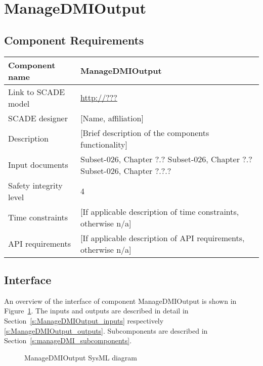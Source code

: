 
\section{ManageDMIOutput}

\subsection{Component Requirements}

\begin{longtable}{p{}p{}}
\toprule
Component name			& ManageDMIOutput \\
\midrule
Link to SCADE model		& {\footnotesize \url{http://???}} \\
\midrule
SCADE designer			& [Name, affiliation] \\
\midrule
Description				& [Brief description of the components functionality] \\
\midrule
Input documents	& 
Subset-026, Chapter ?.?\newline
Subset-026, Chapter ?.?\newline
Subset-026, Chapter ?.?.?\\
\midrule
Safety integrity level		& 4 \\
\midrule
Time constraints		& [If applicable description of time constraints, otherwise n/a] \\
\midrule
API requirements 		& [If applicable description of API requirements, otherwise n/a] \\
\bottomrule
\end{longtable}


\subsection{Interface}

An overview of the interface of component ManageDMIOutput is shown in Figure~\ref{f:ManageDMIOutput}. The inputs and outputs are described in detail in Section~\ref{s:ManageDMIOutput_inputs} respectively \ref{s:ManageDMIOutput_outputs}. Subcomponents are described in Section~\ref{s:manageDMI_subcomponents}.

\begin{figure}
\center
{}
\caption{ManageDMIOutput SysML diagram}\label{f:ManageDMIOutput}
\end{figure}


